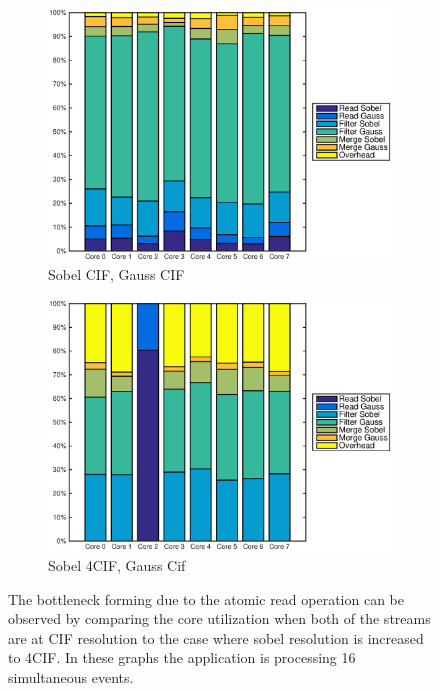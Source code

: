 \begin{figure}
    \centering
    \begin{subfigure}[t]{0.49\textwidth}
        \centering
        \includegraphics[width=0.99\linewidth]{images/openem_cifcif_8cores_eo.eps}
        \caption{Sobel CIF, Gauss CIF}
        \label{fig:oem8coreeo}
    \end{subfigure}
    \begin{subfigure}[t]{0.49\textwidth}
        \centering
        \includegraphics[width=0.99\linewidth]{images/openem_sobel4cif_gausscif_eo.eps}
        \caption{Sobel 4CIF, Gauss Cif}
        \label{fig:oem8coreeosobel4cif}
    \end{subfigure}
    \caption{The bottleneck forming due to the atomic read operation can be observed by comparing the core utilization when both of the streams are at CIF resolution to the case where sobel resolution is increased to 4CIF. In these graphs the application is processing 16 simultaneous events.}
\end{figure}

